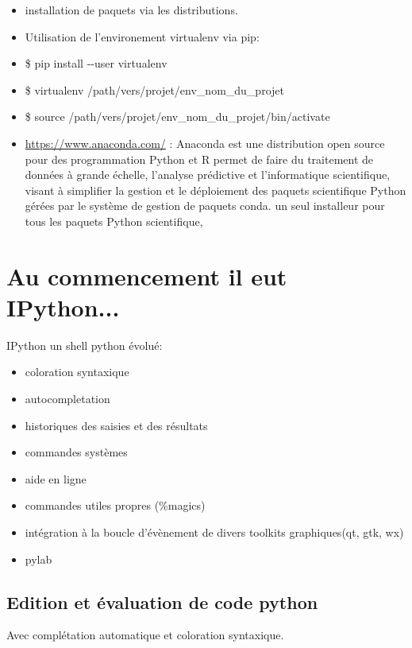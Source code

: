 \documentclass[11pt]{article}
\providecommand{\tightlist}{%
      \setlength{\itemsep}{0pt}\setlength{\parskip}{0pt}}
\begin{document}
\begin{itemize}
\tightlist
\item
  installation de paquets via les distributions.
\item
  Utilisation de l'environement virtualenv via pip:
\item
  \$ pip install -\/-user virtualenv
\item
  \$ virtualenv /path/vers/projet/env\_nom\_du\_projet
\item
  \$ source /path/vers/projet/env\_nom\_du\_projet/bin/activate
\item
  \url{https://www.anaconda.com/} : Anaconda est une distribution open
  source pour des programmation Python et R permet de faire du
  traitement de données à grande échelle, l'analyse prédictive et
  l'informatique scientifique, visant à simplifier la gestion et le
  déploiement des paquets scientifique Python gérées par le système de
  gestion de paquets conda. un seul installeur pour tous les paquets
  Python scientifique,
\end{itemize}

    \section{Au commencement il eut
IPython...}\label{au-commencement-il-eut-ipython...}

IPython un shell python évolué:

\begin{itemize}
\tightlist
\item
  coloration syntaxique
\item
  autocompletation
\item
  historiques des saisies et des résultats
\item
  commandes systèmes
\item
  aide en ligne
\item
  commandes utiles propres (\%magics)
\item
  intégration à la boucle d'évènement de divers toolkits graphiques(qt,
  gtk, wx)
\item
  pylab
\end{itemize}

    \subsection{Edition et évaluation de code
python}\label{edition-et-uxe9valuation-de-code-python}

Avec complétation automatique et coloration syntaxique.
\end{document}
